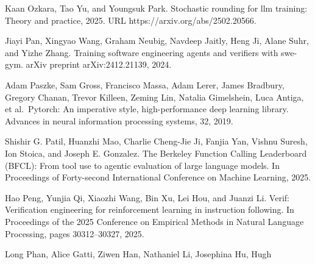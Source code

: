 Kaan Ozkara, Tao Yu, and Youngsuk Park. Stochastic rounding for llm
training: Theory and practice, 2025. URL
https://arxiv.org/abs/2502.20566.

Jiayi Pan, Xingyao Wang, Graham Neubig, Navdeep Jaitly, Heng Ji, Alane
Suhr, and Yizhe Zhang. Training software engineering agents and
verifiers with swe-gym. arXiv preprint arXiv:2412.21139, 2024.

Adam Paszke, Sam Gross, Francisco Massa, Adam Lerer, James Bradbury,
Gregory Chanan, Trevor Killeen, Zeming Lin, Natalia Gimelshein, Luca
Antiga, et al.~Pytorch: An imperative style, high-performance deep
learning library. Advances in neural information processing systems, 32,
2019.

Shishir G. Patil, Huanzhi Mao, Charlie Cheng-Jie Ji, Fanjia Yan, Vishnu
Suresh, Ion Stoica, and Joseph E. Gonzalez. The Berkeley Function
Calling Leaderboard (BFCL): From tool use to agentic evaluation of large
language models. In Proceedings of Forty-second International Conference
on Machine Learning, 2025.

Hao Peng, Yunjia Qi, Xiaozhi Wang, Bin Xu, Lei Hou, and Juanzi Li.
Verif: Verification engineering for reinforcement learning in
instruction following. In Proceedings of the 2025 Conference on Empirical
Methods in Natural Language Processing, pages 30312--30327, 2025.

Long Phan, Alice Gatti, Ziwen Han, Nathaniel Li, Josephina Hu, Hugh
